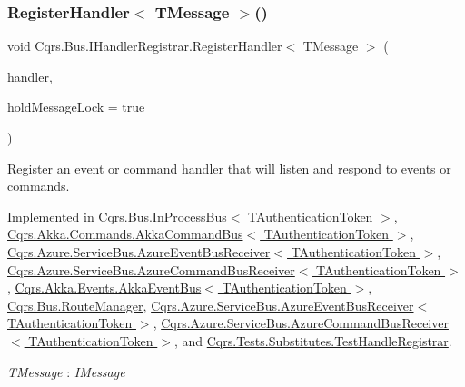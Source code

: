 \subsubsection{\texorpdfstring{Register\+Handler$<$ T\+Message $>$()}{RegisterHandler< TMessage >()}\hspace{0.1cm}{\footnotesize\ttfamily [2/2]}}
{\footnotesize\ttfamily void Cqrs.\+Bus.\+I\+Handler\+Registrar.\+Register\+Handler$<$ T\+Message $>$ (\begin{DoxyParamCaption}\item[{Action$<$ T\+Message $>$}]{handler,  }\item[{bool}]{hold\+Message\+Lock = {\ttfamily true} }\end{DoxyParamCaption})}



Register an event or command handler that will listen and respond to events or commands. 



Implemented in \hyperlink{classCqrs_1_1Bus_1_1InProcessBus_a62171e3c6d155cfdfd921b07b4909adf_a62171e3c6d155cfdfd921b07b4909adf}{Cqrs.\+Bus.\+In\+Process\+Bus$<$ T\+Authentication\+Token $>$}, \hyperlink{classCqrs_1_1Akka_1_1Commands_1_1AkkaCommandBus_adc21072d2b02c745747c4d585a53dba3_adc21072d2b02c745747c4d585a53dba3}{Cqrs.\+Akka.\+Commands.\+Akka\+Command\+Bus$<$ T\+Authentication\+Token $>$}, \hyperlink{classCqrs_1_1Azure_1_1ServiceBus_1_1AzureEventBusReceiver_a0c4ab01eece7025add9aa9ab4d23111d_a0c4ab01eece7025add9aa9ab4d23111d}{Cqrs.\+Azure.\+Service\+Bus.\+Azure\+Event\+Bus\+Receiver$<$ T\+Authentication\+Token $>$}, \hyperlink{classCqrs_1_1Azure_1_1ServiceBus_1_1AzureCommandBusReceiver_a1c9aba2692f51b66921802333433e2f7_a1c9aba2692f51b66921802333433e2f7}{Cqrs.\+Azure.\+Service\+Bus.\+Azure\+Command\+Bus\+Receiver$<$ T\+Authentication\+Token $>$}, \hyperlink{classCqrs_1_1Akka_1_1Events_1_1AkkaEventBus_a6795dfcaf611ce1b50310f442cef0546_a6795dfcaf611ce1b50310f442cef0546}{Cqrs.\+Akka.\+Events.\+Akka\+Event\+Bus$<$ T\+Authentication\+Token $>$}, \hyperlink{classCqrs_1_1Bus_1_1RouteManager_aeb620222dd0351a6d3848caf93e29954_aeb620222dd0351a6d3848caf93e29954}{Cqrs.\+Bus.\+Route\+Manager}, \hyperlink{classCqrs_1_1Azure_1_1ServiceBus_1_1AzureEventBusReceiver_a0c4ab01eece7025add9aa9ab4d23111d_a0c4ab01eece7025add9aa9ab4d23111d}{Cqrs.\+Azure.\+Service\+Bus.\+Azure\+Event\+Bus\+Receiver$<$ T\+Authentication\+Token $>$}, \hyperlink{classCqrs_1_1Azure_1_1ServiceBus_1_1AzureCommandBusReceiver_a1c9aba2692f51b66921802333433e2f7_a1c9aba2692f51b66921802333433e2f7}{Cqrs.\+Azure.\+Service\+Bus.\+Azure\+Command\+Bus\+Receiver$<$ T\+Authentication\+Token $>$}, and \hyperlink{classCqrs_1_1Tests_1_1Substitutes_1_1TestHandleRegistrar_a8eb57abc3420b0968c08c05204caa25c_a8eb57abc3420b0968c08c05204caa25c}{Cqrs.\+Tests.\+Substitutes.\+Test\+Handle\+Registrar}.

\begin{Desc}
\item[Type Constraints]\begin{description}
\item[{\em T\+Message} : {\em I\+Message}]\end{description}
\end{Desc}
